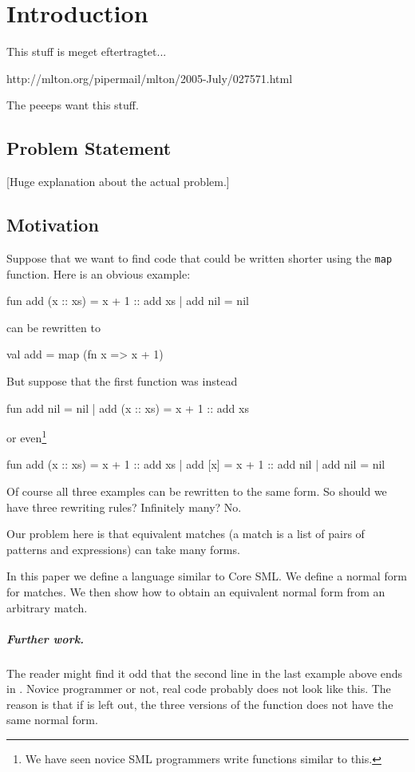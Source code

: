 \chapter{Introduction}

This stuff is meget eftertragtet...

http://mlton.org/pipermail/mlton/2005-July/027571.html 

The peeeps want this stuff.

\section{Problem Statement}

{\footnotesize [Huge explanation about the actual problem.]}

\section{Motivation}
\label{sec:motivation}
Suppose that we want to find code that could be written shorter using the
\texttt{map} function.
Here is an obvious example:
\begin{sml}
fun add (x :: xs) = x + 1 :: add xs
  | add nil       = nil
\end{sml}
can be rewritten to
\begin{sml}
val add = map (fn x => x + 1)
\end{sml}

But suppose that the first function was instead
\begin{sml}
fun add nil       = nil
  | add (x :: xs) = x + 1 :: add xs
\end{sml}
or even\footnote{We have seen novice SML programmers write functions similar to
  this.}
\begin{sml}
fun add (x :: xs) = x + 1 :: add xs
  | add [x]       = x + 1 :: add nil
  | add nil       = nil
\end{sml}
Of course all three examples can be rewritten to the same form. So should we
have three rewriting rules? Infinitely many? No.

Our problem here is that equivalent matches (a match is a list of pairs of
patterns and expressions) can take many forms.

In this paper we define a language similar to Core SML. We define a
normal form for matches. We then show how to obtain an equivalent normal form
from an arbitrary match.

\paragraph{Further work.}
The reader might find it odd that the second line in the last example above ends
in . Novice programmer or not, real code probably does not
look like this. The reason is that if  is left out, the three
versions of the function  does not have the same normal form.

